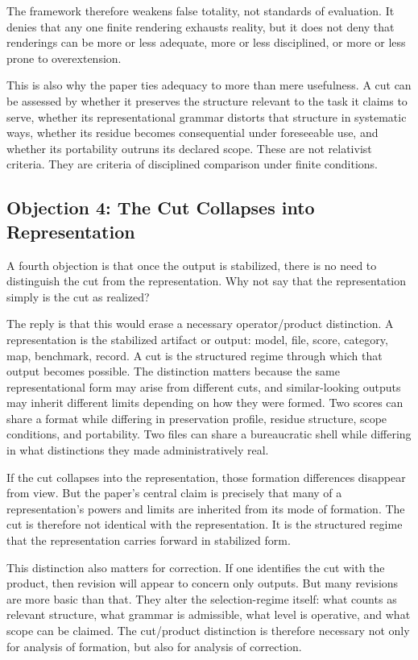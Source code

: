 \documentclass[11pt]{article}
\begin{document}
The framework therefore weakens false totality, not standards of evaluation. It denies that any one finite rendering exhausts reality, but it does not deny that renderings can be more or less adequate, more or less disciplined, or more or less prone to overextension.

This is also why the paper ties adequacy to more than mere usefulness. A cut can be assessed by whether it preserves the structure relevant to the task it claims to serve, whether its representational grammar distorts that structure in systematic ways, whether its residue becomes consequential under foreseeable use, and whether its portability outruns its declared scope. These are not relativist criteria. They are criteria of disciplined comparison under finite conditions.

\subsection{Objection 4: The Cut Collapses into Representation}

A fourth objection is that once the output is stabilized, there is no need to distinguish the cut from the representation. Why not say that the representation simply is the cut as realized?

The reply is that this would erase a necessary operator/product distinction. A representation is the stabilized artifact or output: model, file, score, category, map, benchmark, record. A cut is the structured regime through which that output becomes possible. The distinction matters because the same representational form may arise from different cuts, and similar-looking outputs may inherit different limits depending on how they were formed. Two scores can share a format while differing in preservation profile, residue structure, scope conditions, and portability. Two files can share a bureaucratic shell while differing in what distinctions they made administratively real.

If the cut collapses into the representation, those formation differences disappear from view. But the paper's central claim is precisely that many of a representation's powers and limits are inherited from its mode of formation. The cut is therefore not identical with the representation. It is the structured regime that the representation carries forward in stabilized form.

This distinction also matters for correction. If one identifies the cut with the product, then revision will appear to concern only outputs. But many revisions are more basic than that. They alter the selection-regime itself: what counts as relevant structure, what grammar is admissible, what level is operative, and what scope can be claimed. The cut/product distinction is therefore necessary not only for analysis of formation, but also for analysis of correction.
\end{document}
